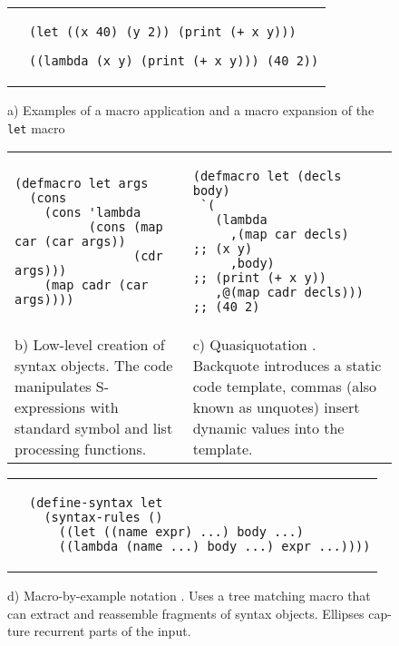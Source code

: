 \documentclass[10pt,journal,a4paper]{IEEEtran}
\begin{document}
\begin{figure*}[t]
\begin{listing}
\normalsize

\begin{tabular}{p{4.0cm} p{15cm}}\\
 &
\begin{verbatim}
(let ((x 40) (y 2)) (print (+ x y)))

((lambda (x y) (print (+ x y))) (40 2))
\end{verbatim}
\end{tabular}

\begin{center}
a) Examples of a macro application and a macro expansion of the \small \texttt{let} \normalsize macro
\end{center}

\begin{tabular}{p{8.5cm} p{8.5cm}}\\
\begin{verbatim}
(defmacro let args
  (cons
    (cons 'lambda
          (cons (map car (car args))
                (cdr args)))
    (map cadr (car args))))
\end{verbatim}
&
\begin{verbatim}
(defmacro let (decls body)
 `(
   (lambda
     ,(map car decls)   ;; (x y)
     ,body)             ;; (print (+ x y))
   ,@(map cadr decls))) ;; (40 2)
\end{verbatim}\\
b) Low-level creation of syntax objects. The code manipulates S-expressions
with standard symbol and list processing functions.
&
c) Quasiquotation \cite{bawden99}.
Backquote introduces a static code template, commas (also known as
unquotes) insert dynamic values into the template.
\end{tabular}

\begin{tabular}{p{3.5cm} p{13.5cm}}\\
 &
\begin{verbatim}
(define-syntax let
  (syntax-rules ()
    ((let ((name expr) ...) body ...)
    ((lambda (name ...) body ...) expr ...))))
\end{verbatim}
\end{tabular}

\begin{adjustwidth}{4cm}{0pt}
d) Macro-by-example notation \cite{kohlbecker87}. Uses a tree matching macro that\\
can extract and reassemble fragments of syntax objects. Ellipses cap-\\ture
recurrent parts of the input.
\end{adjustwidth}


\end{listing}
\end{figure*}
\end{document}
